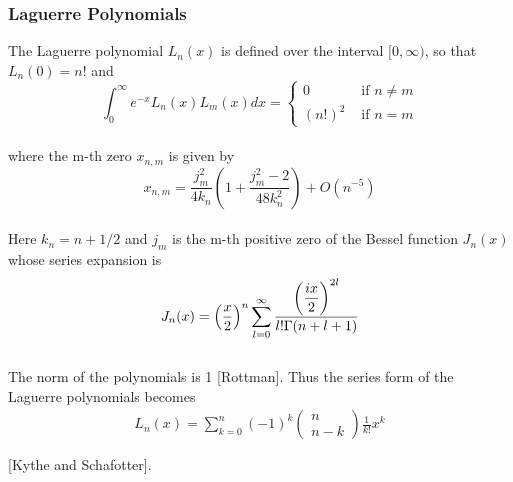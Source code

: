 \documentclass[%
reprint,nofootinbib,
amsmath,amssymb,
aps,
]{revtex4-1}
\begin{document}
\subsubsection{Laguerre Polynomials} \noindent 
The Laguerre polynomial $L_n(x)$ is defined over the interval $[0,\infty)$, so that $L_n(0) = n!$ and \vspace{2mm} \\
\begin{equation*}
\int_{0}^{\infty} e^{-x} L_{n}(x) L_{m}(x) d x=\left\{\begin{array}{ll}{0} & {\text { if } n \neq m} \\ {(n !)^{2}} & {\text { if } n=m}\end{array}\right.
\end{equation*}\vspace{2mm} \\
where the m-th zero $x_{n,m}$ is given by \vspace{2mm} \\
\begin{equation}\label{abs_2}
x_{n, m}=\frac{j_{m}^{2}}{4 k_{n}}\left(1+\frac{j_{m}^{2}-2}{48 k_{n}^{2}}\right)+O\left(n^{-5}\right)
\end{equation}\vspace{2mm} \\
Here $k_n = n + 1/2$ and $j_m$ is the m-th positive zero of the Bessel function $J_n(x)$ whose series expansion is \vspace{2mm} \\
\begin{equation}\label{bessel}
	J_n(x) = \qty(\dfrac{x}{2})^n\sum_{l=0}^{\infty}\dfrac{\qty(
	\dfrac{ix}{2})^{2l}}{l!\Gamma (n+l+1)}
\end{equation}\vspace{2mm} \\The norm of the polynomials is 1 [Rottman]. Thus the series form of the Laguerre polynomials becomes\vspace{2mm} \\
\begin{align}\label{polylag}
L_{n}(x)=\sum_{k=0}^{n}(-1)^{k}\left(\begin{array}{c}{n} \\ {n-k}\end{array}\right) \frac{1}{k !} x^{k} \\ \nonumber \\ \nonumber 
\end{align}\vspace{2mm} 
\hspace{50mm}[Kythe and Schafotter].
\end{document}
